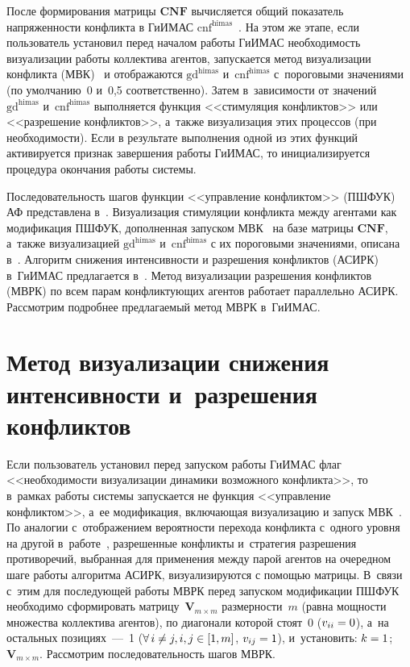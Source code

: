 \begin{multicols}{2}
  После формирования матрицы $\mathbf{CNF}$ вычисляется общий 
показатель напряженности конфликта в \mbox{ГиИМАС} 
$\mathrm{cnf}^{\mathrm{himas}}$~\cite{3-kir}. На этом же этапе, если 
пользователь установил перед началом работы \mbox{ГиИМАС} 
необходимость визуализации работы коллектива агентов, запускается метод 
визуализации конфликта (МВК)~\cite{5-kir} и отображаются 
$\mathrm{gd}^{\mathrm{himas}}$ и~$\mathrm{cnf}^{\mathrm{himas}}$ 
с~пороговыми значениями (по умолчанию~0 и~0,5 соответственно). Затем 
в~зависимости от значений $\mathrm{gd}^{\mathrm{himas}}$ 
и~$\mathrm{cnf}^{\mathrm{himas}}$ выполняется функция <<стимуляция 
конфликтов>> или <<разрешение конфликтов>>, а~также визуализация этих 
процессов (при необходимости). Если в результате выполнения одной из этих 
функций активируется признак завершения работы \mbox{ГиИМАС}, то 
инициализируется процедура окончания работы системы.
  
  Последовательность шагов функции <<управление конфликтом>> 
(ПШФУК) АФ представлена в~\cite{3-kir}. Визуализация стимуляции 
конфликта между агентами как модификация \mbox{ПШФУК}, дополненная 
запуском МВК~\cite{5-kir} на базе матрицы $\mathbf{CNF}$, а~также 
визуализацией $\mathrm{gd}^{\mathrm{himas}}$ 
и~$\mathrm{cnf}^{\mathrm{himas}}$ с их пороговыми значениями, описана 
в~\cite{6-kir}. Алгоритм снижения интенсивности и разрешения конфликтов 
(АСИРК) в~\mbox{ГиИМАС} предлагается в~\cite{4-kir}. Метод визуализации 
разрешения конфликтов (МВРК) по всем парам конфликтующих агентов 
работает параллельно АСИРК. Рассмотрим подробнее предлагаемый метод 
МВРК в~\mbox{ГиИМАС}.
  
\section{Метод визуализации снижения интенсивности 
и~разрешения конфликтов}

  Если пользователь установил перед запуском работы \mbox{ГиИМАС} флаг 
<<необходимости визуализации динамики возможного конфликта>>, то 
в~рамках работы системы запускается не функция <<управление 
конфликтом>>, а~ее модификация, включающая визуализацию и запуск 
МВК~\cite{6-kir}. По аналогии с~отоб\-ра\-же\-ни\-ем вероятности перехода 
конфликта с~одного уровня на другой в~работе~\cite{13-kir}, разрешенные 
конфликты и~стратегия разрешения противоречий, выбранная для применения 
между парой агентов на очередном шаге работы алгоритма АСИРК, 
визуализируются с помощью матрицы. В~связи с~этим для последующей 
работы МВРК перед запуском модификации ПШФУК необходимо 
сформировать матрицу~$\mathbf{V}_{m\times m}$ размерности~$m$ (равна 
мощности множества коллектива агентов), по диагонали которой стоят~0 
($v_{ii}\hm=0$), а~на остальных позициях~---~1 ($\forall\,i\not=j, i,j\hm\in [1,m]$, 
$v_{ij}\hm=1$), и~установить: $k\hm=1$; $\mathbf{V}_{m\times m}$. Рассмотрим последовательность шагов МВРК. 
  

\end{multicols}

